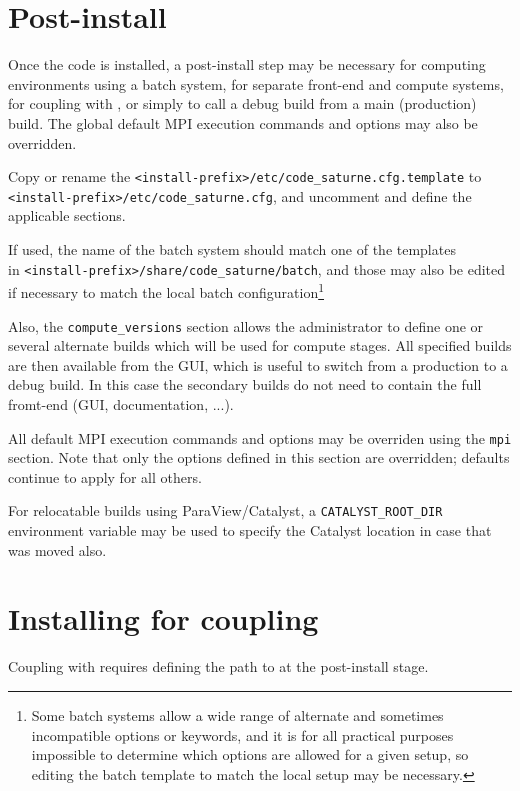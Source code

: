 \documentclass[a4paper,10pt,twoside]{csshortdoc}
\begin{document}
\section{Post-install\label{sec:post_install}}

Once the code is installed, a post-install step may
be necessary for computing environments using a batch system,
for separate front-end and compute systems, for coupling with ,
or simply to call a debug build from a main (production) build.
The global default MPI execution commands and options may also be overridden.

Copy or rename the \texttt{<install-prefix>/etc/code\_saturne.cfg.template} to \\
\texttt{<install-prefix>/etc/code\_saturne.cfg},
and uncomment and define the applicable sections.

If used, the name of the batch system should match one of the templates \\
in \texttt{<install-prefix>/share/code\_saturne/batch},
and those may also be edited if necessary to match the local
batch configuration\footnote{Some batch systems allow a wide
range of alternate and sometimes incompatible options or keywords,
and it is for all practical purposes impossible to determine
which options are allowed for a given setup, so editing the
batch template to match the local setup may be necessary.}

Also, the \texttt{compute\_versions} section allows the administrator
to define one or several alternate builds which will be used for
compute stages. All specified builds are then available from the GUI,
which is useful to switch from a production to a debug build.
In this case the secondary builds do not need to contain the
full fromt-end (GUI, documentation, ...).

All default MPI execution commands and options may be overriden using the
\texttt{mpi} section. Note that only the options defined in this section
are overridden; defaults continue to apply for all others.

For relocatable builds using ParaView/Catalyst, a \texttt{CATALYST\_ROOT\_DIR}
environment variable may be used to specify the Catalyst location
in case that was moved also.

\section{Installing for \syrthes coupling\label{sec:syrthes}}

Coupling with  requires defining the path to 
at the post-install stage.
\end{document}

